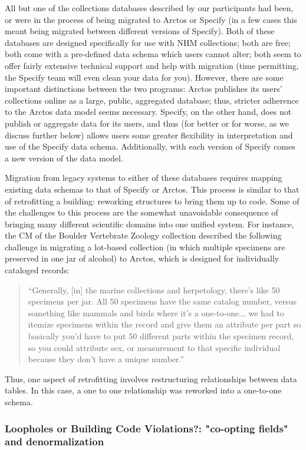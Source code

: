 All but one of the collections databases described by our participants had been, or were in the process of being migrated to Arctos or Specify (in a few cases this meant being migrated between different versions of Specify). Both of these databases are designed specifically for use with NHM collections; both are free; both come with a pre-defined data schema which users cannot alter; both seem to offer fairly extensive technical support and help with migration (time permitting, the Specify team will even clean your data for you). However, there are some important distinctions between the two programs: Arctos publishes its users’ collections online as a large, public, aggregated database; thus, stricter adherence to the Arctos data model seems necessary. Specify, on the other hand, does not publish or aggregate data for its users, and thus (for better or for worse, as we discuss further below) allows users some greater flexibility in interpretation and use of the Specify data schema. Additionally, with each version of Specify comes a new version of the data model.

Migration from legacy systems to either of these databases requires mapping existing data schemas to that of Specify or Arctos. This process is similar to that of retrofitting a building: reworking structures to bring them up to code. Some of the challenges to this process are the somewhat unavoidable consequence of bringing many different scientific domains into one unified system. For instance, the CM of the Boulder Vertebrate Zoology collection described the following challenge in migrating a lot-based collection (in which multiple specimens are preserved in one jar of alcohol) to Arctos, which is designed for individually cataloged records:
\begin{quote}
“Generally, [in] the marine collections and herpetology, there's like 50 specimens per jar. All 50 specimens have the same catalog number, versus something like mammals and birds where it's a one-to-one... we had to itemize specimens within the record and give them an attribute per part so basically you'd have to put 50 different parts within the specimen record, so you could attribute sex, or measurement to that specific individual because they don't have a unique number.”
\end{quote}
Thus, one aspect of retrofitting involves restructuring relationships between data tables.  In this case, a one to one relationship was reworked into a one-to-one schema.

\subsubsection{Loopholes or Building Code Violations?: "co-opting fields" and denormalization }

